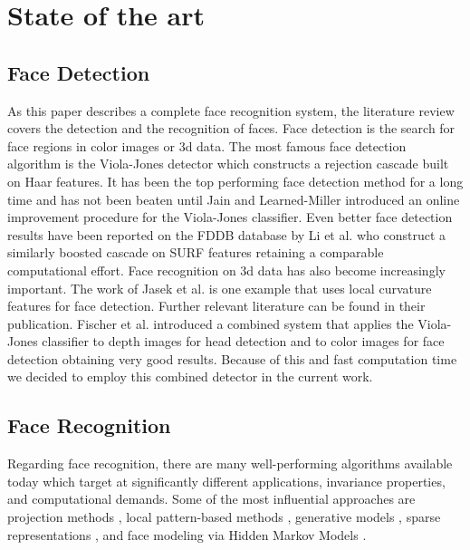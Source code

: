 \chapter{State of the art}
\label{chap:relwork}
\section{Face Detection}
\label{chap:relwork:sec:detection}
As this paper describes a complete face recognition system, the literature review covers the detection and the recognition of faces.
Face detection is the search for face regions in color images or 3d data.
The most famous face detection algorithm is the Viola-Jones detector \cite{Viola01} which constructs a rejection cascade built on Haar features.
It has been the top performing face detection method for a long time and has not been beaten until Jain and Learned-Miller \cite{jain2011} introduced an online improvement procedure for the Viola-Jones classifier.
Even better face detection results have been reported on the FDDB database \cite{jain2010} by Li et al. \cite{li2011} who construct a similarly boosted cascade on SURF features retaining a comparable computational effort.
Face recognition on 3d data has also become increasingly important.
The work of Jasek et al. \cite{Jasek2012} is one example that uses local curvature features for face detection.
Further relevant literature can be found in their publication.
Fischer et al. \cite{Fischer2010} introduced a combined system that applies the Viola-Jones classifier to depth images for head detection and to color images for face detection obtaining very good results.
Because of this and fast computation time %
we decided to employ this combined detector in the current work.

\section{Face Recognition}
\label{chap:relwork:sec:recognition}
Regarding face recognition, there are many well-performing algorithms available today which target at significantly different applications, invariance properties, and computational demands.
Some of the most influential approaches are projection methods \cite{Turk1991,Belhumeur1997,Naseem2010,Yan07,Yang2002,Zhang2010}, local pattern-based methods \cite{Ahonen2006, Tan2010}, generative models \cite{Georghiades01, Lee05}, sparse representations \cite{Wagner2012}, and face modeling via Hidden Markov Models \cite{Samaria1994}.

